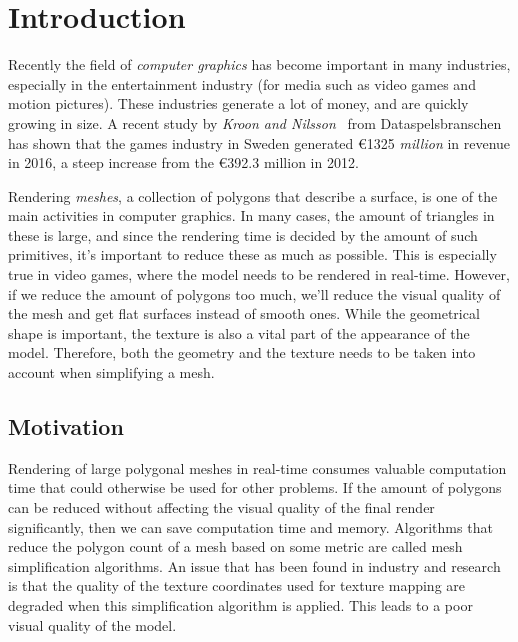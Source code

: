 

\chapter{Introduction}
\label{cha:introduction}

Recently the field of \emph{computer graphics} has become important in many industries, especially in the entertainment industry (for media such as video games and motion pictures). These industries generate a lot of money, and are quickly growing in size. A recent study by \emph{Kroon and Nilsson}~\cite{kroon2017game} from Dataspelsbranschen has shown that the games industry in Sweden generated \euro 1325 \emph{million} in revenue in 2016, a steep increase from the \euro 392.3 million in 2012. 

Rendering \emph{meshes}, a collection of polygons that describe a surface, is one of the main activities in computer graphics. In many cases, the amount of triangles in these is large, and since the rendering time is decided by the amount of such primitives, it's important to reduce these as much as possible. This is especially true in video games, where the model needs to be rendered in real-time. However, if we reduce the amount of polygons too much, we'll reduce the visual quality of the mesh and get flat surfaces instead of smooth ones. While the geometrical shape is important, the texture is also a vital part of the appearance of the model. Therefore, both the geometry and the texture needs to be taken into account when simplifying a mesh.

\section{Motivation}
\label{sec:motivation}

Rendering of large polygonal meshes in real-time consumes valuable computation time that
could otherwise be used for other problems. If the amount of polygons can be reduced without
affecting the visual quality of the final render significantly, then we can save computation time
and memory. Algorithms that reduce the polygon count of a mesh based on some metric are
called mesh simplification algorithms. An issue that has been found in industry and research \cite{} is
that the quality of the texture coordinates used for texture mapping are degraded when this
simplification algorithm is applied. This leads to a poor visual quality of the model.

